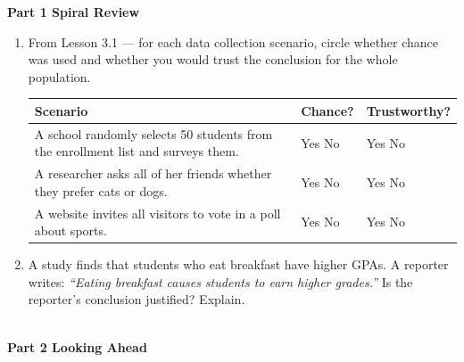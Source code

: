 \documentclass[10pt]{article}
\begin{document}
\namedateperiod

\vspace{0.3in}

{\large\bfseries\color{navy} Part 1 \quad Spiral Review}

\vspace{0.12in}

\begin{enumerate}

    \item From Lesson 3.1 --- for each data collection scenario, circle whether chance
    was used and whether you would trust the conclusion for the whole population.

    \vspace{8pt}
    \renewcommand{\arraystretch}{1.8}
    \begin{tabularx}{\linewidth}{@{} X p{2.2cm} p{2.8cm} @{}}
    \textbf{Scenario} & \textbf{Chance?} & \textbf{Trustworthy?} \\
    \hline
    A school randomly selects 50 students from the enrollment list and surveys them. &
    Yes \quad No & Yes \quad No \\
    A researcher asks all of her friends whether they prefer cats or dogs. &
    Yes \quad No & Yes \quad No \\
    A website invites all visitors to vote in a poll about sports. &
    Yes \quad No & Yes \quad No \\
    \end{tabularx}

    \vspace{0.18in}

    \item A study finds that students who eat breakfast have higher GPAs. A reporter
    writes: \textit{``Eating breakfast causes students to earn higher grades.''} Is
    the reporter's conclusion justified? Explain.\\[6pt]
    \writeline\\[2pt]\writeline

\end{enumerate}

\vspace{0.35in}

{\large\bfseries\color{navy} Part 2 \quad Looking Ahead}

\vspace{0.12in}
\end{document}
